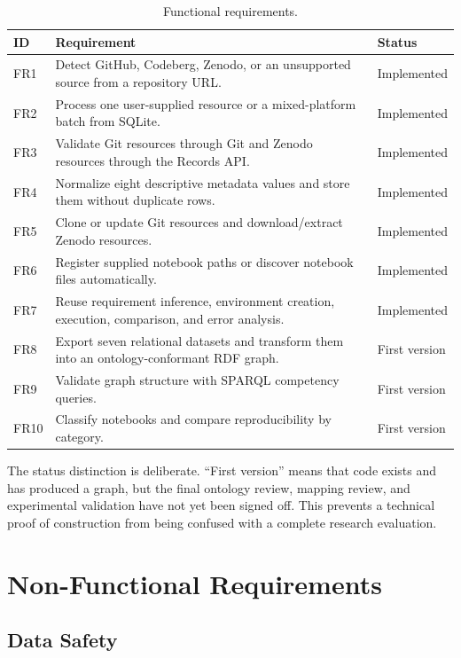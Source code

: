 \begin{table}[ht]
\centering
\caption{Functional requirements.}
\label{tab:functional-requirements}
\small
\begin{tabularx}{\textwidth}{@{}p{1cm}X p{2.7cm}@{}}
\toprule
ID & Requirement & Status\\
\midrule
FR1 & Detect GitHub, Codeberg, Zenodo, or an unsupported source from a repository URL. & Implemented\\
FR2 & Process one user-supplied resource or a mixed-platform batch from SQLite. & Implemented\\
FR3 & Validate Git resources through Git and Zenodo resources through the Records API. & Implemented\\
FR4 & Normalize eight descriptive metadata values and store them without duplicate rows. & Implemented\\
FR5 & Clone or update Git resources and download/extract Zenodo resources. & Implemented\\
FR6 & Register supplied notebook paths or discover notebook files automatically. & Implemented\\
FR7 & Reuse requirement inference, environment creation, execution, comparison, and error analysis. & Implemented\\
FR8 & Export seven relational datasets and transform them into an ontology-conformant RDF graph. & First version\\
FR9 & Validate graph structure with SPARQL competency queries. & First version\\
FR10 & Classify notebooks and compare reproducibility by category. & First version\\
\bottomrule
\end{tabularx}
\end{table}

The status distinction is deliberate. ``First version'' means that code exists and has produced a graph, but the final ontology review, mapping review, and experimental validation have not yet been signed off. This prevents a technical proof of construction from being confused with a complete research evaluation.

\section{Non-Functional Requirements}

\subsection{Data Safety}

